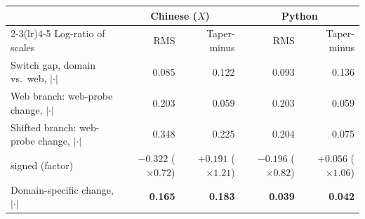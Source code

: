 \begin{tabular}{@{}lrrrr@{}}
\toprule
 & \multicolumn{2}{c}{Chinese ($X$)} & \multicolumn{2}{c}{Python} \\
\cmidrule(lr){2-3}\cmidrule(lr){4-5}
Log-ratio of scales & RMS & Taper-minus & RMS & Taper-minus \\
\midrule
Switch gap, domain vs.\ web, $|\cdot|$ & 0.085 & 0.122 & 0.093 & 0.136 \\
Web branch: web-probe change, $|\cdot|$ & 0.203 & 0.059 & 0.203 & 0.059 \\
Shifted branch: web-probe change, $|\cdot|$ & 0.348 & 0.225 & 0.204 & 0.075 \\
\quad signed (factor) & $-0.322$ ($\times0.72$) & ${+}0.191$ ($\times1.21$) & $-0.196$ ($\times0.82$) & ${+}0.056$ ($\times1.06$) \\
Domain-specific change, $|\cdot|$ & \textbf{0.165} & \textbf{0.183} & \textbf{0.039} & \textbf{0.042} \\
\bottomrule
\end{tabular}
